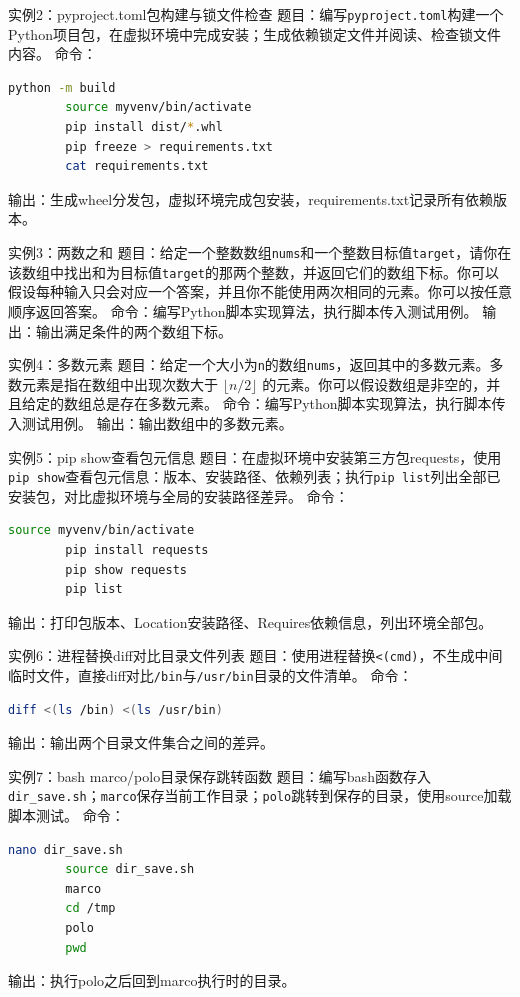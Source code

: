 \documentclass[a4paper,12pt]{ctexart}
\begin{document}
	实例2：pyproject.toml包构建与锁文件检查
	题目：编写\texttt{pyproject.toml}构建一个Python项目包，在虚拟环境中完成安装；生成依赖锁定文件并阅读、检查锁文件内容。
	命令：
	\begin{lstlisting}[language=bash]
		python -m build
		source myvenv/bin/activate
		pip install dist/*.whl
		pip freeze > requirements.txt
		cat requirements.txt
	\end{lstlisting}
	输出：生成wheel分发包，虚拟环境完成包安装，requirements.txt记录所有依赖版本。
	
	实例3：两数之和
	题目：给定一个整数数组\texttt{nums}和一个整数目标值\texttt{target}，请你在该数组中找出和为目标值\texttt{target}的那两个整数，并返回它们的数组下标。你可以假设每种输入只会对应一个答案，并且你不能使用两次相同的元素。你可以按任意顺序返回答案。
	命令：编写Python脚本实现算法，执行脚本传入测试用例。
	输出：输出满足条件的两个数组下标。
	
	实例4：多数元素
	题目：给定一个大小为\texttt{n}的数组\texttt{nums}，返回其中的多数元素。多数元素是指在数组中出现次数大于 $\lfloor n/2 \rfloor$ 的元素。你可以假设数组是非空的，并且给定的数组总是存在多数元素。
	命令：编写Python脚本实现算法，执行脚本传入测试用例。
	输出：输出数组中的多数元素。
	
	实例5：pip show查看包元信息
	题目：在虚拟环境中安装第三方包requests，使用\texttt{pip show}查看包元信息：版本、安装路径、依赖列表；执行\texttt{pip list}列出全部已安装包，对比虚拟环境与全局的安装路径差异。
	命令：
	\begin{lstlisting}[language=bash]
		source myvenv/bin/activate
		pip install requests
		pip show requests
		pip list
	\end{lstlisting}
	输出：打印包版本、Location安装路径、Requires依赖信息，列出环境全部包。
	
	实例6：进程替换diff对比目录文件列表
	题目：使用进程替换\texttt{<(cmd)}，不生成中间临时文件，直接diff对比\texttt{/bin}与\texttt{/usr/bin}目录的文件清单。
	命令：
	\begin{lstlisting}[language=bash]
		diff <(ls /bin) <(ls /usr/bin)
	\end{lstlisting}
	输出：输出两个目录文件集合之间的差异。
	
	实例7：bash marco/polo目录保存跳转函数
	题目：编写bash函数存入\texttt{dir\_save.sh}；\texttt{marco}保存当前工作目录；\texttt{polo}跳转到保存的目录，使用source加载脚本测试。
	命令：
	\begin{lstlisting}[language=bash]
		nano dir_save.sh
		source dir_save.sh
		marco
		cd /tmp
		polo
		pwd
	\end{lstlisting}
	输出：执行polo之后回到marco执行时的目录。
	
\end{document}
